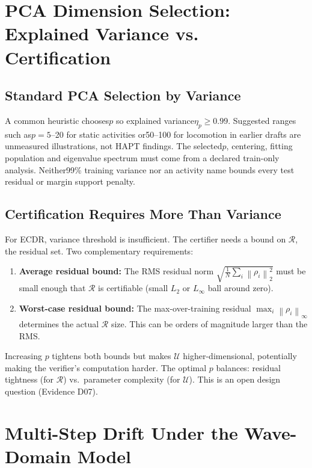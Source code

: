 \documentclass[11pt, a4paper]{article}
\theoremstyle{definition}
\theoremstyle{plain}
\newcommand{\norm}[2]{\left\|#1\right\|_{#2}}
\begin{document}
\section{PCA Dimension Selection: Explained Variance vs. Certification}

\subsection{Standard PCA Selection by Variance}

A common heuristic chooses$p$ so explained variance$\eta_p\ge0.99$.
Suggested ranges such as$p=5$--20 for static activities or50--100 for
locomotion in earlier drafts are unmeasured illustrations, not HAPT findings.
The selected$p$, centering, fitting population and eigenvalue spectrum must
come from a declared train-only analysis. Neither99\% training variance nor
an activity name bounds every test residual or margin support penalty.

\subsection{Certification Requires More Than Variance}

For ECDR, variance threshold is insufficient. The certifier needs a bound on
$\mathcal{R}$, the residual set. Two complementary requirements:

\begin{enumerate}[leftmargin=1.5em]
  \item \textbf{Average residual bound:} The RMS residual norm
        $\sqrt{\frac{1}{N}\sum_i \norm{\rho_i}{2}^2}$ must be small enough that
        $\mathcal{R}$ is certifiable (small $L_2$ or $L_\infty$ ball around zero).
  \item \textbf{Worst-case residual bound:} The max-over-training residual
        $\max_i \norm{\rho_i}{\infty}$ determines the actual $\mathcal{R}$ size.
        This can be orders of magnitude larger than the RMS.
\end{enumerate}

Increasing $p$ tightens both bounds but makes $\mathcal{U}$ higher-dimensional,
potentially making the verifier's computation harder. The optimal $p$ balances:
residual tightness (for $\mathcal{R}$) vs.\ parameter complexity (for $\mathcal{U}$).
This is an open design question (Evidence D07).

\section{Multi-Step Drift Under the Wave-Domain Model}
\end{document}
